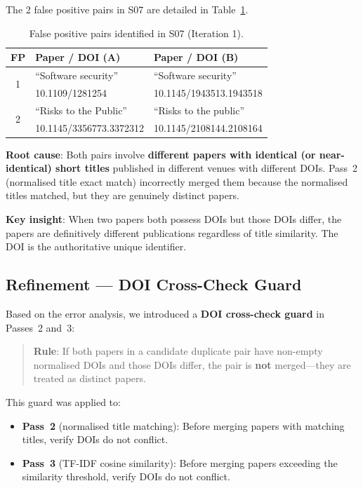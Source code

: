 \documentclass[conference]{IEEEtran}
\begin{document}
The 2 false positive pairs in S07 are detailed in Table~\ref{tab:fp_analysis}.

\begin{table}[htbp]
\centering
\caption{False positive pairs identified in S07 (Iteration 1).}
\label{tab:fp_analysis}
\begin{tabular}{@{}cll@{}}
\toprule
\textbf{FP} & \textbf{Paper / DOI (A)} & \textbf{Paper / DOI (B)} \\
\midrule
\multirow{2}{*}{1} & ``Software security'' & ``Software security'' \\
 & 10.1109/1281254 & 10.1145/1943513.1943518 \\
\midrule
\multirow{2}{*}{2} & ``Risks to the Public'' & ``Risks to the public'' \\
 & 10.1145/3356773.3372312 & 10.1145/2108144.2108164 \\
\bottomrule
\end{tabular}
\end{table}

\textbf{Root cause}: Both pairs involve \textbf{different papers with identical (or near-identical) short titles} published in different venues with different DOIs. Pass~2 (normalised title exact match) incorrectly merged them because the normalised titles matched, but they are genuinely distinct papers.

\textbf{Key insight}: When two papers both possess DOIs but those DOIs differ, the papers are definitively different publications regardless of title similarity. The DOI is the authoritative unique identifier.

\subsection{Refinement --- DOI Cross-Check Guard}

Based on the error analysis, we introduced a \textbf{DOI cross-check guard} in Passes~2 and~3:

\begin{quote}
\textbf{Rule}: If both papers in a candidate duplicate pair have non-empty normalised DOIs and those DOIs differ, the pair is \textbf{not} merged---they are treated as distinct papers.
\end{quote}

This guard was applied to:
\begin{itemize}
    \item \textbf{Pass~2} (normalised title matching): Before merging papers with matching titles, verify DOIs do not conflict.
    \item \textbf{Pass~3} (TF-IDF cosine similarity): Before merging papers exceeding the similarity threshold, verify DOIs do not conflict.
\end{itemize}
\end{document}
